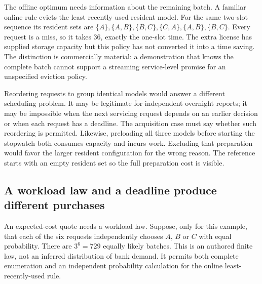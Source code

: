 The offline optimum needs information about the remaining batch. A familiar
online rule evicts the least recently used resident model. For the same
two-slot sequence its resident sets are $\{A\},\{A,B\},\{B,C\},\{C,A\},
\{A,B\},\{B,C\}$. Every request is a miss, so it takes 36, exactly the
one-slot time. The extra license has supplied storage capacity but this policy
has not converted it into a time saving. The distinction is commercially
material: a demonstration that knows the complete batch cannot support a
streaming service-level promise for an unspecified eviction policy.

Reordering requests to group identical models would answer a different
scheduling problem. It may be legitimate for independent overnight reports;
it may be impossible when the next servicing request depends on an earlier
decision or when each request has a deadline. The acquisition case must say
whether such reordering is permitted. Likewise, preloading all three models
before starting the stopwatch both consumes capacity and incurs work. Excluding
that preparation would favor the larger resident configuration for the wrong
reason. The reference starts with an empty resident set so the full preparation
cost is visible.

\subsection{A workload law and a deadline produce different purchases}
\label{exec17:s8-resident-workload}

An expected-cost quote needs a workload law. Suppose, only for this example,
that each of the six requests independently chooses $A$, $B$ or $C$ with
equal probability. There are $3^6=729$ equally likely batches. This is an
authored finite law, not an inferred distribution of bank demand. It permits
both complete enumeration and an independent probability calculation for the
online least-recently-used rule.

